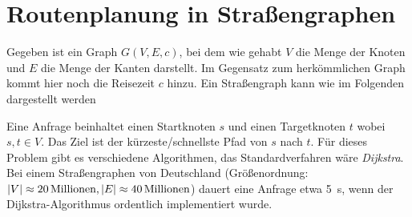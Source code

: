 \documentclass{scrartcl}%
\begin{document}

    \section*{Routenplanung in Straßengraphen}
    Gegeben ist ein Graph $G(V, E, c)$, bei dem wie gehabt $V$ die Menge der Knoten und $E$ die Menge der Kanten darstellt.
    Im Gegensatz zum herkömmlichen Graph kommt hier noch die Reisezeit $c$ hinzu.
    Ein Straßengraph kann wie im Folgenden dargestellt werden

    \begin{figure}[htb]
        \centering
    \end{figure}

    Eine Anfrage beinhaltet einen Startknoten $s$ und einen Targetknoten $t$ wobei $s,t \in V$.
    Das Ziel ist der kürzeste/schnellste Pfad von $s$ nach $t$.
    Für dieses Problem gibt es verschiedene Algorithmen, das Standardverfahren wäre \textit{Dijkstra}.
    Bei einem Straßengraphen von Deutschland (Größenordnung: $|V| \approx 20 \text{\,Millionen}, |E| \approx 40 \text{\,Millionen}$) dauert eine Anfrage etwa \SI{5}{\s},
    wenn der Dijkstra-Algorithmus ordentlich implementiert wurde.
\end{document}
